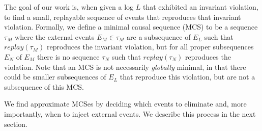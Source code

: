 The goal of our work is, when given a log $L$ that exhibited an
invariant violation, to find a small, replayable sequence of events that reproduces that
invariant violation. Formally, we define a minimal causal sequence (MCS)
to be a sequence $\tau_M$ where the external events $E_M \in \tau_M$ are a
subsequence of $E_L$ such
that $replay(\tau_M)$ reproduces the invariant violation, but for all proper
subsequences $E_N$ of $E_M$
there is no sequence $\tau_N$ such that $replay(\tau_N)$ reproduces the violation.
Note that an MCS is not necessarily {\em globally} minimal, in that there could be smaller
subsequences of $E_L$ that reproduce this violation, but are not a subsequence of this MCS.

We find approximate MCSes by deciding
which events to eliminate and, more importantly, when to inject external
events. We describe this process in the next section.
